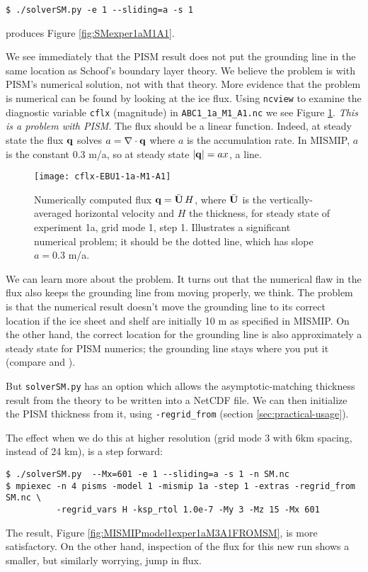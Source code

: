 \verb|$ ./solverSM.py -e 1 --sliding=a -s 1|

\noindent produces Figure \ref{fig:SMexper1aM1A1}.

We see immediately that the PISM result does not put the grounding line in the same location as Schoof's boundary layer theory.  We believe the problem is with PISM's numerical solution, not with that theory.  More evidence that the problem is numerical can be found by looking at the ice flux.  Using \verb|ncview| to examine the diagnostic variable \verb|cflx| (magnitude) in \verb|ABC1_1a_M1_A1.nc| we see Figure \ref{fig:cflx1aM1A1}.  \emph{This is a problem with PISM}.  The flux should be a linear function.  Indeed, at steady state the flux $\mathbf{q}$ solves $a=\nabla\cdot\mathbf{q}$ where $a$ is the accumulation rate.  In MISMIP, $a$ is the constant $0.3$ m/a, so at steady state $|\mathbf{q}| = a x$, a line.

\begin{figure}[ht]
\texttt{[image: cflx-EBU1-1a-M1-A1]}
\caption{Numerically computed flux $\mathbf{q} = \bar{\mathbf{U}}\, H$, where $\bar{\mathbf{U}}$ is the vertically-averaged horizontal velocity and $H$ the thickness, for steady state of experiment 1a, grid mode 1, step 1.  Illustrates a significant numerical problem; it should be the dotted line, which has slope $a = 0.3$ m/a.}
\label{fig:cflx1aM1A1}
\end{figure}

We can learn more about the problem.  It turns out that the numerical flaw in the flux also keeps the grounding line from moving properly, we think.  The problem is that the numerical result doesn't move the grounding line to its correct location if the ice sheet and shelf are initially 10 m as specified in MISMIP.  On the other hand, the correct location for the grounding line is also approximately a steady state for PISM numerics; the grounding line stays where you put it (compare \cite{SchoofMarine2} and \cite{VieliPayne}).

But \verb|solverSM.py| has an option which allows the asymptotic-matching thickness result from the \cite{SchoofMarine1} theory to be written into a NetCDF file.  We can then initialize the PISM thickness from it, using \verb|-regrid_from| (section \ref{sec:practical-usage}).

The effect when we do this at higher resolution (grid mode 3 with 6km spacing, instead of 24 km), is a step forward:

\begin{verbatim}
$ ./solverSM.py  --Mx=601 -e 1 --sliding=a -s 1 -n SM.nc
$ mpiexec -n 4 pisms -model 1 -mismip 1a -step 1 -extras -regrid_from SM.nc \
          -regrid_vars H -ksp_rtol 1.0e-7 -My 3 -Mz 15 -Mx 601
\end{verbatim}
\noindent The result, Figure \ref{fig:MISMIPmodel1exper1aM3A1FROMSM}, is more satisfactory.  On the other hand, inspection of the flux for this new run shows a smaller, but similarly worrying, jump in flux.

